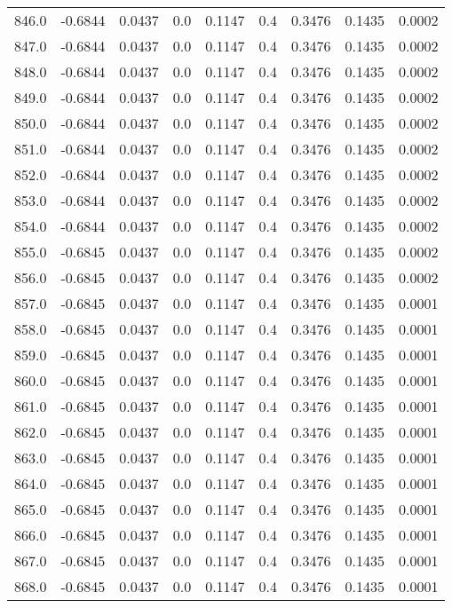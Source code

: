 \begin{longtable}{lrrrrrrrr}
846.0 & -0.6844 & 0.0437 & 0.0 & 0.1147 & 0.4 & 0.3476 & 0.1435 & 0.0002 \\
847.0 & -0.6844 & 0.0437 & 0.0 & 0.1147 & 0.4 & 0.3476 & 0.1435 & 0.0002 \\
848.0 & -0.6844 & 0.0437 & 0.0 & 0.1147 & 0.4 & 0.3476 & 0.1435 & 0.0002 \\
849.0 & -0.6844 & 0.0437 & 0.0 & 0.1147 & 0.4 & 0.3476 & 0.1435 & 0.0002 \\
850.0 & -0.6844 & 0.0437 & 0.0 & 0.1147 & 0.4 & 0.3476 & 0.1435 & 0.0002 \\
851.0 & -0.6844 & 0.0437 & 0.0 & 0.1147 & 0.4 & 0.3476 & 0.1435 & 0.0002 \\
852.0 & -0.6844 & 0.0437 & 0.0 & 0.1147 & 0.4 & 0.3476 & 0.1435 & 0.0002 \\
853.0 & -0.6844 & 0.0437 & 0.0 & 0.1147 & 0.4 & 0.3476 & 0.1435 & 0.0002 \\
854.0 & -0.6844 & 0.0437 & 0.0 & 0.1147 & 0.4 & 0.3476 & 0.1435 & 0.0002 \\
855.0 & -0.6845 & 0.0437 & 0.0 & 0.1147 & 0.4 & 0.3476 & 0.1435 & 0.0002 \\
856.0 & -0.6845 & 0.0437 & 0.0 & 0.1147 & 0.4 & 0.3476 & 0.1435 & 0.0002 \\
857.0 & -0.6845 & 0.0437 & 0.0 & 0.1147 & 0.4 & 0.3476 & 0.1435 & 0.0001 \\
858.0 & -0.6845 & 0.0437 & 0.0 & 0.1147 & 0.4 & 0.3476 & 0.1435 & 0.0001 \\
859.0 & -0.6845 & 0.0437 & 0.0 & 0.1147 & 0.4 & 0.3476 & 0.1435 & 0.0001 \\
860.0 & -0.6845 & 0.0437 & 0.0 & 0.1147 & 0.4 & 0.3476 & 0.1435 & 0.0001 \\
861.0 & -0.6845 & 0.0437 & 0.0 & 0.1147 & 0.4 & 0.3476 & 0.1435 & 0.0001 \\
862.0 & -0.6845 & 0.0437 & 0.0 & 0.1147 & 0.4 & 0.3476 & 0.1435 & 0.0001 \\
863.0 & -0.6845 & 0.0437 & 0.0 & 0.1147 & 0.4 & 0.3476 & 0.1435 & 0.0001 \\
864.0 & -0.6845 & 0.0437 & 0.0 & 0.1147 & 0.4 & 0.3476 & 0.1435 & 0.0001 \\
865.0 & -0.6845 & 0.0437 & 0.0 & 0.1147 & 0.4 & 0.3476 & 0.1435 & 0.0001 \\
866.0 & -0.6845 & 0.0437 & 0.0 & 0.1147 & 0.4 & 0.3476 & 0.1435 & 0.0001 \\
867.0 & -0.6845 & 0.0437 & 0.0 & 0.1147 & 0.4 & 0.3476 & 0.1435 & 0.0001 \\
868.0 & -0.6845 & 0.0437 & 0.0 & 0.1147 & 0.4 & 0.3476 & 0.1435 & 0.0001 \\

\end{longtable}
